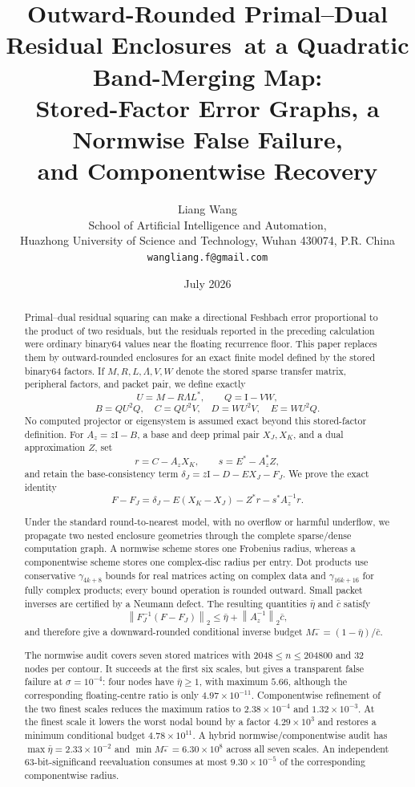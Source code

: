 \documentclass[11pt]{article}
\title{\textbf{Outward-Rounded Primal--Dual Residual Enclosures}\
\textbf{at a Quadratic Band-Merging Map:}\\[0.35em]
\large Stored-Factor Error Graphs, a Normwise False Failure,\\
and Componentwise Recovery}
\author{Liang Wang\\
\small School of Artificial Intelligence and Automation,\\[-0.2em]
\small Huazhong University of Science and Technology, Wuhan 430074, P.R. China\\
\small \texttt{wangliang.f@gmail.com}}
\date{July 2026}
\theoremstyle{definition}
\theoremstyle{remark}
\newcommand{\Id}{\mathrm I}
\newcommand{\norm}[1]{\left\lVert#1\right\rVert}
\begin{document}
\maketitle

\begin{abstract}
Primal--dual residual squaring can make a directional Feshbach error
proportional to the product of two residuals, but the residuals reported in
the preceding calculation were ordinary binary64 values near the floating
recurrence floor.  This paper replaces them by outward-rounded enclosures
for an exact finite model defined by the stored binary64 factors.  If
\(M,R,L,\Lambda,V,W\) denote the stored sparse transfer matrix,
peripheral factors, and packet pair, we define exactly
\[
 U=M-R\Lambda L^*,\qquad Q=\Id-VW,
\]
\[
 B=QU^2Q,\quad C=QU^2V,\quad D=WU^2V,\quad E=WU^2Q.
\]
No computed projector or eigensystem is assumed exact beyond this
stored-factor definition.  For \(A_z=z\Id-B\), a base and deep primal pair
\(X_J,X_K\), and a dual approximation \(Z\), set
\[
 r=C-A_zX_K,\qquad s=E^*-A_z^*Z,
\]
and retain the base-consistency term
\(\delta_J=z\Id-D-EX_J-F_J\).  We prove the exact identity
\[
 F-F_J=\delta_J-E(X_K-X_J)-Z^*r-s^*A_z^{-1}r.
\]

Under the standard round-to-nearest model, with no overflow or harmful
underflow, we propagate two nested enclosure geometries through the complete
sparse/dense computation graph.  A normwise scheme stores one Frobenius
radius, whereas a componentwise scheme stores one complex-disc radius per
entry.  Dot products use conservative
\(\gamma_{4k+8}\) bounds for real matrices acting on complex data and
\(\gamma_{16k+16}\) for fully complex products; every bound operation is
rounded outward.  Small packet inverses are certified by a Neumann defect.
The resulting quantities \(\bar\eta\) and \(\bar c\) satisfy
\[
 \norm{F_J^{-1}(F-F_J)}_2
 \leq \bar\eta+\norm{A_z^{-1}}_2\bar c,
\]
and therefore give a downward-rounded conditional inverse budget
\(M_*^-=(1-\bar\eta)/\bar c\).

The normwise audit covers seven stored matrices with
\(2048\leq n\leq204800\) and 32 nodes per contour.  It succeeds at the
first six scales, but gives a transparent false failure at
\(\sigma=10^{-4}\): four nodes have \(\bar\eta\geq1\), with maximum
\(5.66\), although the corresponding floating-centre ratio is only
\(4.97\times10^{-11}\).  Componentwise refinement of the two finest scales
reduces the maximum ratios to \(2.38\times10^{-4}\) and
\(1.32\times10^{-3}\).  At the finest scale it lowers the worst nodal bound
by a factor \(4.29\times10^3\) and restores a minimum conditional budget
\(4.78\times10^{11}\).  A hybrid normwise/componentwise audit has
\(\max\bar\eta=2.33\times10^{-2}\) and
\(\min M_*^-=6.30\times10^8\) across all seven scales.  An independent
63-bit-significand reevaluation consumes at most \(9.30\times10^{-5}\) of
the corresponding componentwise radius.


\end{abstract}
\end{document}
